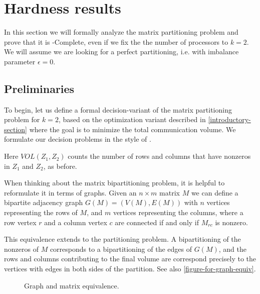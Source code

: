 \documentclass{article}
\newcommand{\mbpt}{\textsc{Matrix \allowbreak Bipartition} }
\begin{document}
	\section{Hardness results}
	In this section we will formally analyze the matrix partitioning
	problem and prove that it is \NP-Complete, even if we fix the
	the number of processors to $k = 2$. We will assume we are looking
	for a perfect partitioning, i.e. with imbalance parameter $\epsilon = 0$.

	\subsection{Preliminaries}
	\label{1-preliminaries}
	To begin, let us define a formal decision-variant of the matrix
	partitioning problem for $k = 2$, based on the optimization
	variant described in \autoref{introductory-section} where the goal
	is to minimize the total communication volume. We formulate our
	decision problems in the style of \cite{npbook}.

	\begin{problem}
		\problemtitle{\mbpt}
	\end{problem}

	Here $VOL(Z_1, Z_2)$ counts the number of rows and columns that
	have nonzeros in $Z_1$ and $Z_2$, as before.

	When thinking about the matrix bipartitioning problem, it is helpful
	to reformulate it in terms of graphs. Given an $n \times m$ matrix $M$
	we can define a bipartite adjacency graph $G(M) = (V(M), E(M))$ with
	$n$ vertices representing the rows of $M$, and $m$ vertices representing
	the columns, where a row vertex $r$ and a column vertex $c$ are connected
	if and only if $M_{rc}$ is nonzero.

	This equivalence extends to the partitioning problem. A bipartitioning of
	the nonzeros of $M$ corresponds to a bipartitioning of the edges of $G(M)$,
	and the rows and columns contributing to the final volume are correspond
	precisely to the vertices with edges in both sides of the partition. See
	also \autoref{figure-for-graph-equiv}.

	\begin{figure}[h]
		
		\centering
		\label{mat-equiv}
		\caption{Graph and matrix equivalence.}
	\end{figure}
	
\end{document}

